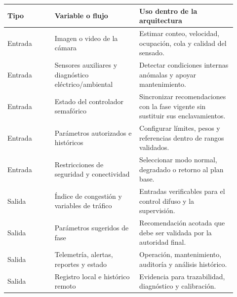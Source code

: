 \documentclass[12pt,a4paper,oneside]{report}
\begin{document}
\begin{center}
\label{fig:caja-negra-v2}
\end{center}

\begin{longtable}{@{}p{0.19\linewidth}p{0.34\linewidth}p{0.39\linewidth}@{}}
\toprule
\textbf{Tipo} & \textbf{Variable o flujo} & \textbf{Uso dentro de la arquitectura}\\
\midrule
\endhead
Entrada & Imagen o video de la cámara & Estimar conteo, velocidad, ocupación, cola y calidad del sensado.\\
Entrada & Sensores auxiliares y diagnóstico eléctrico/ambiental & Detectar condiciones internas anómalas y apoyar mantenimiento.\\
Entrada & Estado del controlador semafórico & Sincronizar recomendaciones con la fase vigente sin sustituir sus enclavamientos.\\
Entrada & Parámetros autorizados e históricos & Configurar límites, pesos y referencias dentro de rangos validados.\\
Entrada & Restricciones de seguridad y conectividad & Seleccionar modo normal, degradado o retorno al plan base.\\
Salida & Índice de congestión y variables de tráfico & Entradas verificables para el control difuso y la supervisión.\\
Salida & Parámetros sugeridos de fase & Recomendación acotada que debe ser validada por la autoridad final.\\
Salida & Telemetría, alertas, reportes y estado & Operación, mantenimiento, auditoría y análisis histórico.\\
Salida & Registro local e histórico remoto & Evidencia para trazabilidad, diagnóstico y calibración.\\
\bottomrule
\end{longtable}
\end{document}
